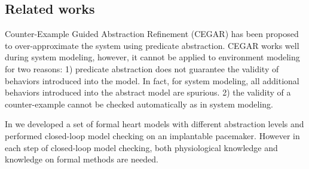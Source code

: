 \subsection{Related works}
Counter-Example Guided Abstraction Refinement (CEGAR) \cite{CEGAR} has been proposed to over-approximate the system using predicate abstraction. 
CEGAR works well during system modeling, however, it cannot be applied to environment modeling for two reasons: 1) predicate abstraction does not guarantee the validity of behaviors introduced into the model. In fact, for system modeling, all additional behaviors introduced into the abstract model are spurious. 2) the validity of a counter-example cannot be checked automatically as in system modeling. 

In \cite{sttt13} we developed a set of formal heart models with different abstraction levels and performed closed-loop model checking on an implantable pacemaker. 
However in each step of closed-loop model checking, both physiological knowledge and knowledge on formal methods are needed.

